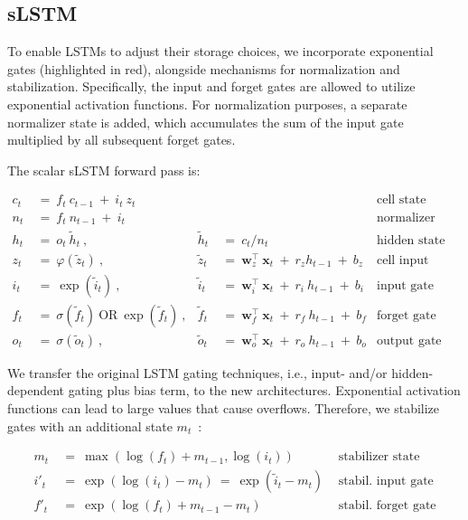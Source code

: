 \subsection{sLSTM}
\label{sec:sLSTM}

To enable LSTMs to adjust their storage choices, we incorporate exponential gates (highlighted in red), alongside mechanisms for normalization and stabilization. Specifically, the input and forget gates are allowed to utilize exponential activation functions. For normalization purposes, a separate normalizer state is added, which accumulates the sum of the input gate multiplied by all subsequent forget gates.

The scalar sLSTM forward pass is:

\begin{align}
\label{eq:slstmforward}
c_t \ &= \  f_t \ c_{t-1} \ + \ i_t \ z_t & & 
 &\text{cell state} \\
n_t \ &= \  f_t \ n_{t-1} \ + \ i_t  & & 
 &\text{normalizer state} \\
h_t \ &= \ o_t \ \tilde{h}_t \ ,
  &\tilde{h}_t \ &= \ c_t / n_t
&\text{hidden state} \\
z_t \ &= \ \varphi \left( \tilde{z}_t \right) \ , 
  &\tilde{z}_t \ &=  \ \mathbf{w}^\top_{z} \ \mathbf{x}_t \ + \
  r_{z}  h_{t-1} \ + \  b_{z}
  &\text{cell input} \\
i_t \ &= \ \!\exp \left( \tilde{i}_t  \right) \ , 
  &\tilde{i}_t \ &= \ \mathbf{w}^\top_{i} \ \mathbf{x}_t \ + \
  r_{i}  \ h_{t-1} \ + \  b_{i}
  &\text{input gate} \\
f_t \ &= \ \sigma \left(  \tilde{f}_t \right) \ \text{OR} \
\!\exp \left(  \tilde{f}_t \right) \ ,
  &\tilde{f}_t \ &= \ \mathbf{w}^\top_{f} \ \mathbf{x}_t  \ + \
  r_{f}  \ h_{t-1} \ + \  b_{f}
  &\text{forget gate} \\
o_t \ &= \ \sigma \left( \tilde{o}_t \right) \ , 
  &\tilde{o}_t  \ &= \ \mathbf{w}^\top_{o} \ \mathbf{x}_t \ + \
  r_{o}  \ h_{t-1} \ + \  b_{o}
  &\text{output gate} 
\end{align}

We transfer the original LSTM gating techniques, i.e., input- and/or hidden-dependent gating plus bias term, to the new architectures. Exponential activation functions can lead to large values that cause overflows. Therefore, we stabilize gates with an additional state \mbox{$m_t$~\citep{Milakov:18arxiv}}:

\begin{align}
\label{eq:slstmstabil}
m_t \ &= \ \max \left( \log ( f_t ) + m_{t-1} , \log ( i_t ) \right) &\text{stabilizer state} \\
i'_t \ &= \ \!\exp \left( \log \left ( i_t \right) - m_t \right) \ = \ \!\exp \left( \tilde{i}_t - m_t \right) \ \, 
  &\text{stabil. input gate} \\
f'_t \ &= \ \!\exp \left( \log \left( f_t \right) + m_{t-1} - m_t \right) \ \, 
  &\text{stabil. forget gate}
\end{align}

